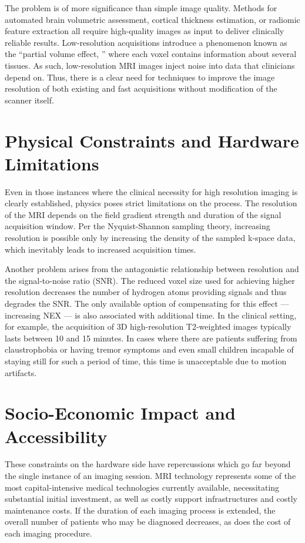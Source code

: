 The problem is of more significance than simple image quality. Methods for automated brain volumetric assessment, cortical thickness estimation, or radiomic feature extraction all require high-quality images as input to deliver clinically reliable results. Low-resolution acquisitions introduce a phenomenon known as the ``partial volume effect, '' where each voxel contains information about several tissues. As such, low-resolution MRI images inject noise into data that clinicians depend on. Thus, there is a clear need for techniques to improve the image resolution of both existing and fast acquisitions without modification of the scanner itself.

\section{Physical Constraints and Hardware Limitations}
Even in those instances where the clinical necessity for high resolution imaging is clearly established, physics poses strict limitations on the process. The resolution of the MRI depends on the field gradient strength and duration of the signal acquisition window. Per the Nyquist-Shannon sampling theory, increasing resolution is possible only by increasing the density of the sampled k-space data, which inevitably leads to increased acquisition times.

Another problem arises from the antagonistic relationship between resolution and the signal-to-noise ratio (SNR). The reduced voxel size used for achieving higher resolution decreases the number of hydrogen atoms providing signals and thus degrades the SNR. The only available option of compensating for this effect — increasing NEX — is also associated with additional time. In the clinical setting, for example, the acquisition of 3D high-resolution T2-weighted images typically lasts between 10 and 15 minutes. In cases where there are patients suffering from claustrophobia or having tremor symptoms and even small children incapable of staying still for such a period of time, this time is unacceptable due to motion artifacts.

\section{Socio-Economic Impact and Accessibility}
These constraints on the hardware side have repercussions which go far beyond the single instance of an imaging session. MRI technology represents some of the most capital-intensive medical technologies currently available, necessitating substantial initial investment, as well as costly support infrastructures and costly maintenance costs. If the duration of each imaging process is extended, the overall number of patients who may be diagnosed decreases, as does the cost of each imaging procedure.

